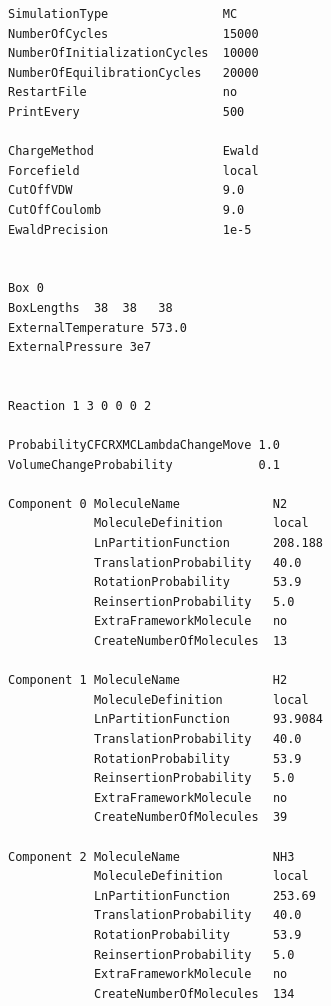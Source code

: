 \begin{verbatim}
SimulationType                MC
NumberOfCycles                15000
NumberOfInitializationCycles  10000
NumberOfEquilibrationCycles   20000
RestartFile                   no
PrintEvery                    500

ChargeMethod                  Ewald
Forcefield                    local
CutOffVDW                     9.0
CutOffCoulomb                 9.0
EwaldPrecision                1e-5


Box 0
BoxLengths  38  38   38
ExternalTemperature 573.0
ExternalPressure 3e7


Reaction 1 3 0 0 0 2

ProbabilityCFCRXMCLambdaChangeMove 1.0
VolumeChangeProbability            0.1

Component 0 MoleculeName             N2
            MoleculeDefinition       local
            LnPartitionFunction      208.188
            TranslationProbability   40.0
            RotationProbability      53.9
            ReinsertionProbability   5.0
            ExtraFrameworkMolecule   no
            CreateNumberOfMolecules  13

Component 1 MoleculeName             H2
            MoleculeDefinition       local
            LnPartitionFunction      93.9084
            TranslationProbability   40.0
            RotationProbability      53.9
            ReinsertionProbability   5.0
            ExtraFrameworkMolecule   no
            CreateNumberOfMolecules  39

Component 2 MoleculeName             NH3
            MoleculeDefinition       local
            LnPartitionFunction      253.69
            TranslationProbability   40.0
            RotationProbability      53.9
            ReinsertionProbability   5.0
            ExtraFrameworkMolecule   no
            CreateNumberOfMolecules  134
\end{verbatim}


